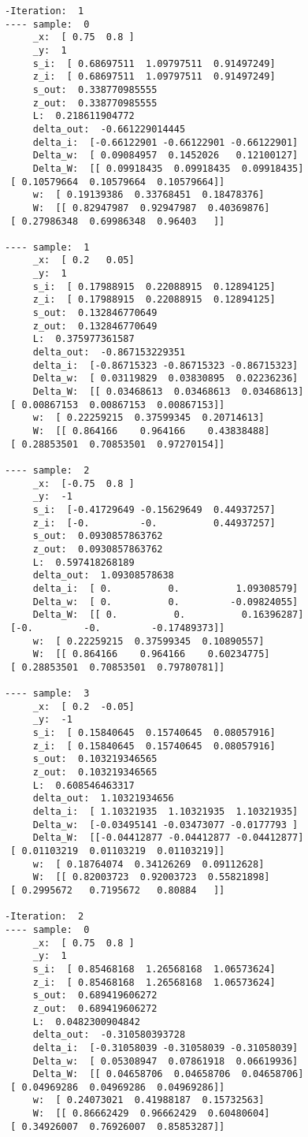 \documentclass[10pt]{article}
\begin{document}
\begin{multicols}{3}
\begin{tiny}
\begin{verbatim}
-Iteration:  1
---- sample:  0
     _x:  [ 0.75  0.8 ]
     _y:  1
     s_i:  [ 0.68697511  1.09797511  0.91497249]
     z_i:  [ 0.68697511  1.09797511  0.91497249]
     s_out:  0.338770985555
     z_out:  0.338770985555
     L:  0.218611904772
     delta_out:  -0.661229014445
     delta_i:  [-0.66122901 -0.66122901 -0.66122901]
     Delta_w:  [ 0.09084957  0.1452026   0.12100127]
     Delta_W:  [[ 0.09918435  0.09918435  0.09918435]
 [ 0.10579664  0.10579664  0.10579664]]
     w:  [ 0.19139386  0.33768451  0.18478376]
     W:  [[ 0.82947987  0.92947987  0.40369876]
 [ 0.27986348  0.69986348  0.96403   ]]

---- sample:  1
     _x:  [ 0.2   0.05]
     _y:  1
     s_i:  [ 0.17988915  0.22088915  0.12894125]
     z_i:  [ 0.17988915  0.22088915  0.12894125]
     s_out:  0.132846770649
     z_out:  0.132846770649
     L:  0.375977361587
     delta_out:  -0.867153229351
     delta_i:  [-0.86715323 -0.86715323 -0.86715323]
     Delta_w:  [ 0.03119829  0.03830895  0.02236236]
     Delta_W:  [[ 0.03468613  0.03468613  0.03468613]
 [ 0.00867153  0.00867153  0.00867153]]
     w:  [ 0.22259215  0.37599345  0.20714613]
     W:  [[ 0.864166    0.964166    0.43838488]
 [ 0.28853501  0.70853501  0.97270154]]

---- sample:  2
     _x:  [-0.75  0.8 ]
     _y:  -1
     s_i:  [-0.41729649 -0.15629649  0.44937257]
     z_i:  [-0.         -0.          0.44937257]
     s_out:  0.0930857863762
     z_out:  0.0930857863762
     L:  0.597418268189
     delta_out:  1.09308578638
     delta_i:  [ 0.          0.          1.09308579]
     Delta_w:  [ 0.          0.         -0.09824055]
     Delta_W:  [[ 0.          0.          0.16396287]
 [-0.         -0.         -0.17489373]]
     w:  [ 0.22259215  0.37599345  0.10890557]
     W:  [[ 0.864166    0.964166    0.60234775]
 [ 0.28853501  0.70853501  0.79780781]]

---- sample:  3
     _x:  [ 0.2  -0.05]
     _y:  -1
     s_i:  [ 0.15840645  0.15740645  0.08057916]
     z_i:  [ 0.15840645  0.15740645  0.08057916]
     s_out:  0.103219346565
     z_out:  0.103219346565
     L:  0.608546463317
     delta_out:  1.10321934656
     delta_i:  [ 1.10321935  1.10321935  1.10321935]
     Delta_w:  [-0.03495141 -0.03473077 -0.0177793 ]
     Delta_W:  [[-0.04412877 -0.04412877 -0.04412877]
 [ 0.01103219  0.01103219  0.01103219]]
     w:  [ 0.18764074  0.34126269  0.09112628]
     W:  [[ 0.82003723  0.92003723  0.55821898]
 [ 0.2995672   0.7195672   0.80884   ]]

-Iteration:  2
---- sample:  0
     _x:  [ 0.75  0.8 ]
     _y:  1
     s_i:  [ 0.85468168  1.26568168  1.06573624]
     z_i:  [ 0.85468168  1.26568168  1.06573624]
     s_out:  0.689419606272
     z_out:  0.689419606272
     L:  0.0482300904842
     delta_out:  -0.310580393728
     delta_i:  [-0.31058039 -0.31058039 -0.31058039]
     Delta_w:  [ 0.05308947  0.07861918  0.06619936]
     Delta_W:  [[ 0.04658706  0.04658706  0.04658706]
 [ 0.04969286  0.04969286  0.04969286]]
     w:  [ 0.24073021  0.41988187  0.15732563]
     W:  [[ 0.86662429  0.96662429  0.60480604]
 [ 0.34926007  0.76926007  0.85853287]]


\end{verbatim}
\end{tiny}
\end{multicols}
\end{document}
